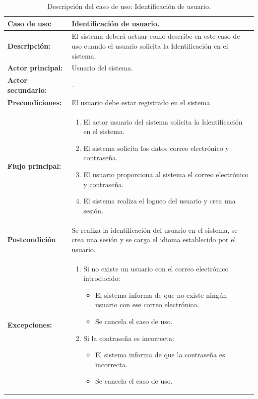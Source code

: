 \begin{table}[H]
  \begin{center}
    \begin{tabular}{|p{3.5cm}|p{10cm}|}
      \hline
      {\textbf{Caso de uso:}} & { Identificación de usuario.} \\
      \hline
      {\textbf{Descripción:}} & { El sistema deberá actuar como describe en este caso de uso cuando el usuario solicita la Identificación en el sistema.} \\
     \hline
      {\textbf{Actor principal:}} & { Usuario del sistema.} \\
      \hline
      {\textbf{Actor secundario:}} & { - } \\
      \hline
      {\textbf{Precondiciones:}} & { El usuario debe estar registrado en el sistema } \\
     \hline   
    {\textbf{Flujo principal:}} & { 
      \begin{enumerate}
	\item El actor usuario del sistema solicita la Identificación en el sistema.
	\item El sistema solicita los datos correo electrónico y contraseña.
	\item El usuario proporciona al sistema el correo electrónico y contraseña.
	\item El sistema realiza el logueo del usuario y crea una sesión.
      \end{enumerate}
      } \\
     \hline
     {\textbf{Postcondición}} & {Se realiza la identificación del usuario en el sistema, se crea una sesión y se carga el idioma establecido por el usuario.}\\
     \hline
         {\textbf{Excepciones:}} & {
         \begin{enumerate}
          \item Si no existe un usuario con el correo electrónico introducido:
          \begin{itemize}
           \item El sistema informa de que no existe ningún usuario con ese correo electrónico.
           \item Se cancela el caso de uso.
          \end{itemize}
	  \item Si la contraseña es incorrecta:
	    \begin{itemize}
	      \item El sistema informa de que la contraseña es incorrecta.
	      \item Se cancela el caso de uso.
	    \end{itemize}
         \end{enumerate}
         }\\
     \hline
    \end{tabular}
  \end{center}
\caption{Descripción del caso de uso: Identificación de usuario.}
\end{table}


